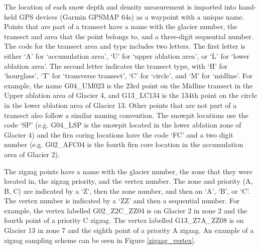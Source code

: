 \documentclass[12pt]{article}
\begin{document}
The location of each snow depth and density measurement is imported into hand-held GPS devices (Garmin GPSMAP 64s) as a waypoint with a unique name. Points that are part of a transect have a name with the glacier number, the transect and area that the point belongs to, and a three-digit sequential number. The code for the transect area and type includes two letters. The first letter is either `A' for `accumulation area', `U' for `upper ablation area', or `L' for `lower ablation area'. The second letter indicates the transect type, with `H' for `hourglass', `T' for `transverse transect', `C' for `circle', and `M' for `midline'. For example, the name G04\_UM023 is the 23rd point on the Midline transect in the Upper ablation area of Glacier 4, and G13\_LC134 is the 134th point on the circle in the lower ablation area of Glacier 13. Other points that are not part of a transect also follow a similar naming convention. The snowpit locations use the code `SP' (e.g. G04\_LSP is the snowpit located in the lower ablation zone of Glacier 4) and the firn coring locations have the code `FC' and a two digit number (e.g. G02\_AFC04 is the fourth firn core location in the accumulation area of Glacier 2).

The zigzag points have a name with the glacier number, the zone that they were located in, the zigzag priority, and the vertex number. The zone and priority (A, B, C) are indicated by a `Z', then the zone number, and then an `A', `B', or `C'. The vertex number is indicated by a `ZZ' and then a sequential number. For example, the vertex labelled G02\_Z2C\_ZZ04 is on Glacier 2 in zone 2 and the fourth point of a priority C zigzag. The vertex labelled G13\_Z7A\_ZZ08 is on Glacier 13 in zone 7 and the eighth point of a priority A zigzag. An example of a zigzag sampling scheme can be seen in Figure \ref{zigzag_vertex}.
\end{document}
